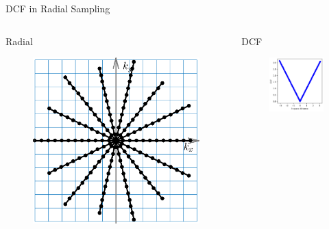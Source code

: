 \begin{frame}{DCF in Radial Sampling}

    \begin{columns}
	\begin{column}{0.35\textwidth}
		\centering
		Radial
		\begin{figure}
			\includegraphics[width=\columnwidth]{fig/mri-trj-radial.png}
		\end{figure}
	\end{column}
	
	\begin{column}{0.35\textwidth}
		\centering
		DCF
		\begin{figure}
			\includegraphics[width=\columnwidth]{fig/dcf.png}
		\end{figure}
	\end{column}
	\end{columns}


\end{frame}
